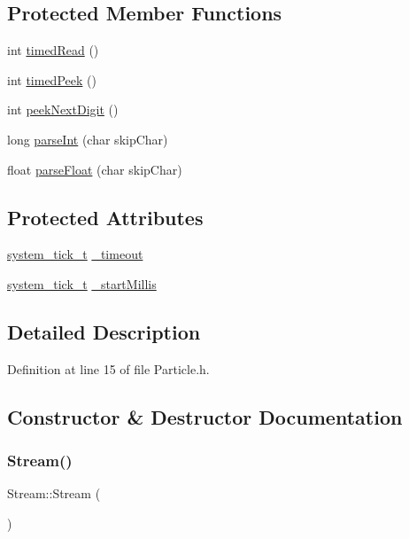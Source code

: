\subsection*{Protected Member Functions}
\begin{DoxyCompactItemize}
\item 
int \hyperlink{class_stream_a416a0ada5ed3c9d27f1e72c7d73f0aa1}{timed\+Read} ()
\item 
int \hyperlink{class_stream_ae326bf60a3c5276836526710871046fe}{timed\+Peek} ()
\item 
int \hyperlink{class_stream_ab31c533ddc422c8d8df07986e5920534}{peek\+Next\+Digit} ()
\item 
long \hyperlink{class_stream_a4578615defade6c4ce7daeb6578bb62d}{parse\+Int} (char skip\+Char)
\item 
float \hyperlink{class_stream_a14a98cdbb166008f25dd044d836b1864}{parse\+Float} (char skip\+Char)
\end{DoxyCompactItemize}
\subsection*{Protected Attributes}
\begin{DoxyCompactItemize}
\item 
\hyperlink{system__tick__hal_8h_a272b267acff35fc07ab6b6011843dd6c}{system\+\_\+tick\+\_\+t} \hyperlink{class_stream_ae1fc2b43124fc405406ce18b7e22d48c}{\+\_\+timeout}
\item 
\hyperlink{system__tick__hal_8h_a272b267acff35fc07ab6b6011843dd6c}{system\+\_\+tick\+\_\+t} \hyperlink{class_stream_abbead2dae5b725a965860b65fb7f6b34}{\+\_\+start\+Millis}
\end{DoxyCompactItemize}


\subsection{Detailed Description}


Definition at line 15 of file Particle.\+h.



\subsection{Constructor \& Destructor Documentation}
\mbox{\label{class_stream_a8c3f05bd00361ec92627fa41f330a39b}} 
\subsubsection{\texorpdfstring{Stream()}{Stream()}}
{\footnotesize\ttfamily Stream\+::\+Stream (\begin{DoxyParamCaption}{ }\end{DoxyParamCaption})\hspace{0.3cm}{\ttfamily [inline]}}



